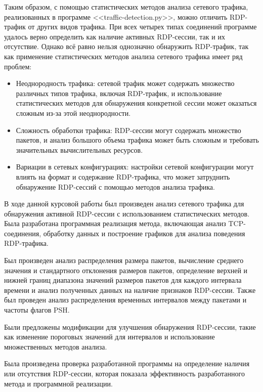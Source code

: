 \documentclass[bachelor, och, coursework]{SCWorks}
\begin{document}
Таким образом, с помощью статистических методов анализа сетевого трафика, реализованных в программе <<traffic-detection.py>>, можно
отличить RDP-трафик от других видов трафика. При всех четырех типах соединений программе удалось верно определить как наличие активных RDP-сессии,
так и их отсутствие. Однако всё равно нельзя однозначно обнаружить RDP-трафик, так как применение статистических методов анализа сетевого трафика
имеет ряд проблем:

\begin{itemize}
  \item Неоднородность трафика: сетевой трафик может содержать множество различных типов трафика, включая RDP-трафик, и использование статистических 
  методов для обнаружения конкретной сессии может оказаться сложным из-за этой неоднородности.
  \item Сложность обработки трафика: RDP-сессии могут содержать множество пакетов, и анализ большого объема трафика может быть сложным и требовать 
  значительных вычислительных ресурсов.
  \item Вариации в сетевых конфигурациях: настройки сетевой конфигурации могут влиять на формат и содержание RDP-трафика, что может затруднить 
  обнаружение RDP-сессий с помощью методов анализа трафика.
\end{itemize}

\conclusion
  
В ходе данной курсовой работы был произведен анализ сетевого трафика для обнаружения активной RDP-сессии с использованием статистических методов. 
Была разработана программная реализация метода, включающая анализ TCP-соединения, обработку данных и построение графиков для анализа поведения 
RDP-трафика. 

Был произведен анализ распределения размера пакетов, вычисление среднего значения и стандартного отклонения размеров пакетов, определение 
верхней и нижней границ диапазона значений размеров пакетов для каждого интервала времени и анализ полученных данных на наличие признаков 
RDP-сессии. Также был проведен анализ распределения временных интервалов между пакетами и частоты флагов PSH.

Были предложены модификации для улучшения обнаружения RDP-сессии, такие как изменение пороговых значений для интервалов и использование 
множественных методов анализа.

Была произведена проверка разработанной программы на определение наличия или отсутствия RDP-сессии, которая показала эффективность 
разработанного метода и программной реализации.
\end{document}
